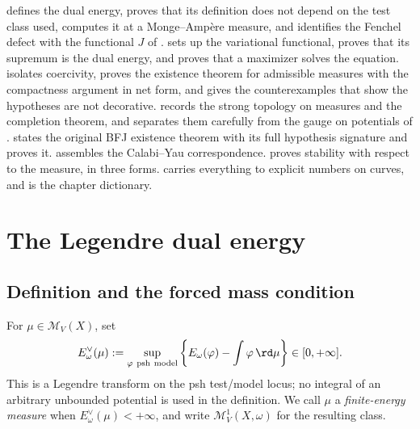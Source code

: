  defines the dual energy, proves that its
definition does not depend on the test class used, computes it at a
Monge--Amp\`ere measure, and identifies the Fenchel defect with the
functional \(J\) of .
 sets up the variational functional, proves that
its supremum is the dual energy, and proves that a maximizer solves the
equation.   isolates coercivity, proves the
existence theorem for admissible measures with the compactness argument in
net form, and gives the counterexamples that show the hypotheses are not
decorative.   records the strong topology on
measures and the completion theorem, and separates them carefully from the
gauge on potentials of .
 states the original BFJ existence theorem with
its full hypothesis signature and proves it.  
assembles the Calabi--Yau correspondence.   proves
stability with respect to the measure, in three forms.
 carries everything to explicit numbers on curves, and
 is the chapter dictionary.

\section{The Legendre dual energy}
\label{sec:ch28-dual-energy}

\subsection{Definition and the forced mass condition}
\label{sec:ch28-dual-def}

\begin{definition}
\label{def:dual-energy-measure}
For \(\mu\in\mathcal M_V(X)\), set
\begin{equation}
\label{eq:dual-energy-measure}
 E_\omega^\vee(\mu)
 :=\sup_{\varphi\ \mathrm{psh\ model}}
       \left\{E_\omega(\varphi)-\int\varphi\,\rd \mu\right\}
 \in[0,+\infty].
\end{equation}
This is a Legendre transform on the psh test/model locus; no integral of an
arbitrary unbounded potential is used in the definition.  We call \(\mu\) a
\emph{finite-energy measure} when
\(E_\omega^\vee(\mu)<+\infty\), and write
\(\mathcal M^1_V(X,\omega)\) for the resulting class.
\end{definition}

